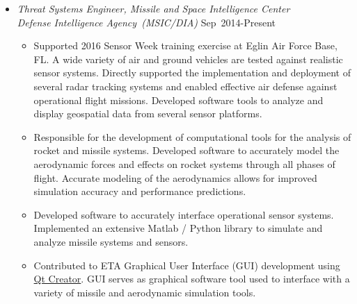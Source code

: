 \begin{itemize}

\item[] \textit{Threat Systems Engineer, Missile and Space Intelligence Center \\
                Defense Intelligence Agency~(MSIC/DIA)}
                \hfill {Sep~2014-Present}
\begin{itemize}
    \item Supported 2016 Sensor Week training exercise at Eglin Air Force Base, FL.
    A wide variety of air and ground vehicles are tested against realistic sensor systems. 
    Directly supported the implementation and deployment of several radar tracking systems and enabled effective air defense against operational flight missions.
    Developed software tools to analyze and display geospatial data from several sensor platforms.
    \item Responsible for the development of computational tools for the analysis of rocket and missile systems.
    Developed software to accurately model the aerodynamic forces and effects on rocket systems through all phases of flight.
    Accurate modeling of the aerodynamics allows for improved simulation accuracy and performance predictions.
    \item Developed software to accurately interface operational sensor systems.
    Implemented an extensive Matlab / Python library to simulate and analyze missile systems and sensors. 
    \item Contributed to ETA Graphical User Interface (GUI) development using \href{https://www.qt.io/ide/}{Qt Creator}.
    GUI serves as graphical software tool used to interface with a variety of missile and aerodynamic simulation tools.
\end{itemize}
        

\end{itemize}
